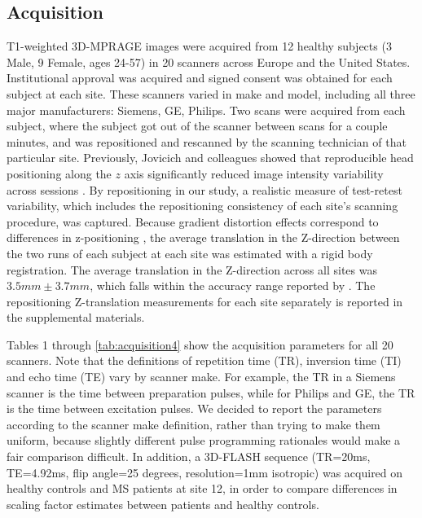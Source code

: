 \subsection{Acquisition}
T1-weighted 3D-MPRAGE images were acquired from 12 healthy subjects (3 Male, 9 Female, ages 24-57) in 20 scanners across Europe and the United States. Institutional approval was acquired and signed consent was obtained for each subject at each site. These scanners varied in make and model, including all three major manufacturers: Siemens, GE, Philips. Two scans were acquired from each subject, where the subject got out of the scanner between scans for a couple minutes, and was repositioned and rescanned by the scanning technician of that particular site. Previously, Jovicich and colleagues showed that reproducible head positioning along the $z$ axis significantly reduced image intensity variability across sessions \cite{freesurferReliability}. By repositioning in our study, a realistic measure of test-retest variability, which includes the repositioning consistency of each site's scanning procedure, was captured. Because gradient distortion effects correspond to differences in z-positioning \cite{caramanos2010gradient}, the average translation in the Z-direction between the two runs of each subject at each site was estimated with a rigid body registration. The average translation in the Z-direction across all sites was $3.5mm \pm 3.7mm$, which falls within the accuracy range reported by \cite{caramanos2010gradient}. The repositioning Z-translation measurements for each site separately is reported in the supplemental materials.

Tables 1 through \ref{tab:acquisition4} show the acquisition parameters for all 20 scanners. Note that the definitions of repetition time (TR), inversion time (TI) and echo time (TE) vary by scanner make. For example, the TR in a Siemens scanner is the time between preparation pulses, while for Philips and GE, the TR is the time between excitation pulses. We decided to report the parameters according to the scanner make definition, rather than trying to make them uniform, because slightly different pulse programming rationales would make a fair comparison difficult. In addition, a 3D-FLASH sequence (TR=20ms, TE=4.92ms, flip angle=25 degrees, resolution=1mm isotropic) was acquired on healthy controls and MS patients at site 12, in order to compare differences in scaling factor estimates between patients and healthy controls. 